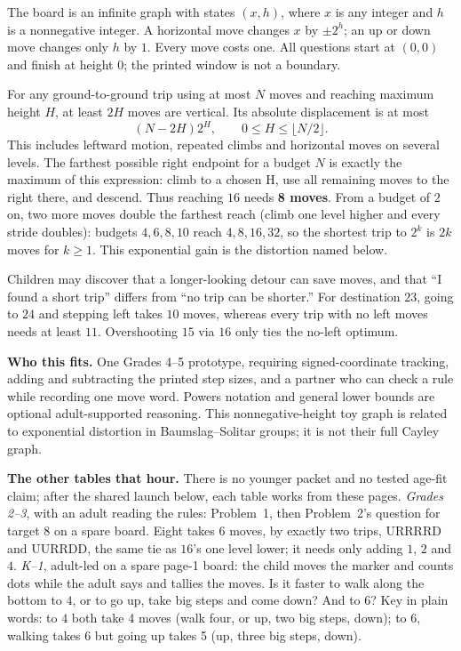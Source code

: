 \documentclass[11pt,letterpaper]{article}
\newcommand{\sect}[1]{\par\vspace{5pt}{\large\bfseries #1}\par\nopagebreak}
\begin{document}
\sect{The mathematics first}
The board is an infinite graph with states $(x,h)$, where $x$ is any integer and
$h$ is a nonnegative integer. A horizontal move changes $x$ by $\pm2^h$;
an up or down move changes only $h$ by $1$. Every move costs one. All questions
start at $(0,0)$ and finish at height $0$; the printed window is not a boundary.

For any ground-to-ground trip using at most $N$ moves and reaching maximum
height $H$, at least $2H$ moves are vertical. Its absolute displacement is at most
\[
 (N-2H)2^H,\qquad 0\le H\le\lfloor N/2\rfloor.
\]
This includes leftward motion, repeated climbs and horizontal moves on several
levels. The farthest possible right endpoint for a budget $N$ is exactly the
maximum of this expression: climb to a chosen H, use all remaining moves to the
right there, and descend. Thus reaching $16$ needs \textbf{8 moves}.
From a budget of $2$ on, two more moves double the farthest reach (climb one
level higher and every stride doubles): budgets $4,6,8,10$ reach $4,8,16,32$, so
the shortest trip to $2^k$ is $2k$ moves for $k\ge1$. This exponential gain is
the distortion named below.

Children may discover that a longer-looking detour can save moves, and that
``I found a short trip'' differs from ``no trip can be shorter.'' For destination
$23$, going to $24$ and stepping left takes $10$ moves, whereas every trip with
no left moves needs at least $11$. Overshooting $15$ via $16$ only ties the
no-left optimum.

\textbf{Who this fits.} One Grades 4--5 prototype, requiring signed-coordinate
tracking, adding and subtracting the printed step sizes, and a partner who can check a rule
while recording one move word. Powers notation and general lower bounds are
optional adult-supported reasoning. This nonnegative-height toy graph is related to exponential
distortion in Baumslag--Solitar groups; it is not their full Cayley graph.

\textbf{The other tables that hour.} There is no younger packet and no tested
age-fit claim; after the shared launch below, each table works from these pages.
\emph{Grades 2--3}, with an adult reading the rules: Problem~1, then Problem~2's
question for target $8$ on a spare board. Eight takes $6$ moves, by exactly two
trips, URRRRD and UURRDD, the same tie as $16$'s one level lower; it needs only
adding $1$, $2$ and $4$. \emph{K--1}, adult-led on a spare page-1 board: the
child moves the marker and counts dots while the adult says and tallies the moves.
Is it faster to walk along the bottom to $4$, or to go up, take big steps and come
down? And to $6$? Key in plain words: to $4$ both take 4 moves (walk four, or up,
two big steps, down); to $6$, walking takes 6 but going up takes 5 (up, three big
steps, down).
\end{document}
